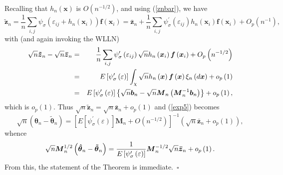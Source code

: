 \documentclass[times, authoryear, 12pt, twoside]{elsarticle}
\begin{document}
Recalling that $h_{n}\left( \boldsymbol{x}\right) $ is $O\left(
n^{-1/2}\right) $, and using (\ref{znbar}), we have%
\begin{equation*}
\boldsymbol{\tilde{z}}_{n}=\frac{1}{n}\sum_{i,j}\psi _{\sigma }\left(
\varepsilon _{ij}+h_{n}\left( \boldsymbol{x}_{i}\right) \right) \boldsymbol{f%
}\left( \boldsymbol{x}_{i}\right) =\boldsymbol{\bar{z}}_{n}+\frac{1}{n}%
\sum_{i,j}\psi _{\sigma }^{\prime }\left( \varepsilon _{ij}\right)
h_{n}\left( \boldsymbol{x}_{i}\right) \boldsymbol{f}\left( \boldsymbol{x}%
_{i}\right) +O_{p}\left( n^{-1}\right) ,
\end{equation*}%
with (and again invoking the WLLN)%
\begin{eqnarray*}
\sqrt{n}\boldsymbol{\tilde{z}}_{n}-\sqrt{n}\boldsymbol{\bar{z}}_{n} &=&\frac{%
1}{n}\sum_{i,j}\psi _{\sigma }^{\prime }\left( \varepsilon _{ij}\right) 
\sqrt{n}h_{n}\left( \boldsymbol{x}_{i}\right) \boldsymbol{f}\left( 
\boldsymbol{x}_{i}\right) +O_{p}\left( n^{-1/2}\right)  \\
&=&E\left[ \psi _{\sigma }^{\prime }\left( \varepsilon \right) \right] \int_{%
\mathcal{\chi }}\sqrt{n}h_{n}\left( \boldsymbol{x}\right) \boldsymbol{f}%
\left( \boldsymbol{x}\right) \xi _{n}\left( d\boldsymbol{x}\right)
+o_{p}\left( 1\right)  \\
&=&E\left[ \psi _{\sigma }^{\prime }\left( \varepsilon \right) \right]
\left\{ \sqrt{n}\boldsymbol{b}_{n}-\sqrt{n}\boldsymbol{M}_{n}\left( 
\boldsymbol{M}_{n}^{-1}\boldsymbol{b}_{n}\right) \right\} +o_{p}\left(
1\right) ,
\end{eqnarray*}%
which is $o_{p}\left( 1\right) $. Thus $\sqrt{n}\boldsymbol{\tilde{z}}_{n}=%
\sqrt{n}\boldsymbol{\bar{z}}_{n}+o_{p}(1)$ and (\ref{exp5}) becomes%
\begin{equation*}
\sqrt{n}\left( \boldsymbol{\hat{\theta}}_{n}-\boldsymbol{\tilde{\theta}}%
_{n}\right) =\left[ E\left[ \psi _{\sigma }^{\prime }\left( \varepsilon
\right) \right] \boldsymbol{M}_{n}+O\left( n^{-1/2}\right) \right]
^{-1}\left( \sqrt{n}\boldsymbol{\bar{z}}_{n}+o_{p}\left( 1\right) \right) ,
\end{equation*}%
whence
\begin{equation}
\sqrt{n}\boldsymbol{M}_{n}^{1/2}\left( \boldsymbol{\hat{%
\theta}}_{n}-\boldsymbol{\tilde{\theta}}_{n}\right) =\frac{1}{E\left[ \psi
_{\sigma }^{{\prime} }\left( \varepsilon \right) %
\right] }\boldsymbol{M}_{n}^{-1/2}\sqrt{n}\boldsymbol{\bar{z}}%
_{n}+o_{p}\left( 1\right) .  \label{represent}
\end{equation}%
From this, the statement of the Theorem is immediate.\hfill\ $\square $
\end{document}

